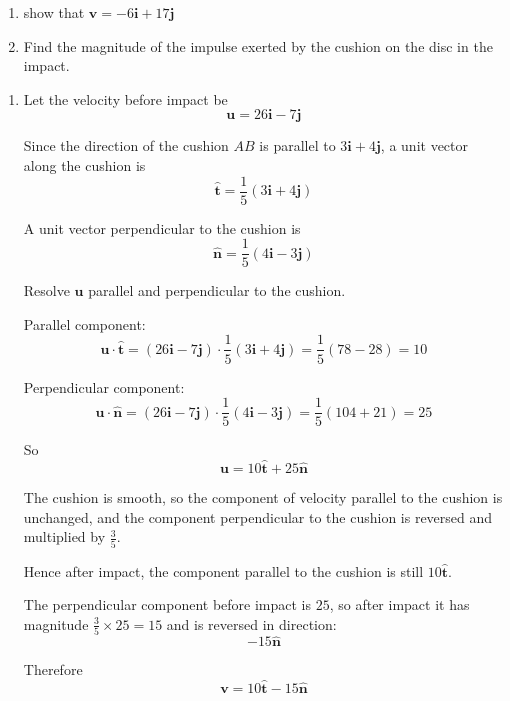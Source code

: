 \documentclass[leqno]{article}
\begin{document}
\begin{enumerate}[
  label=\textbf{\arabic*.},
  leftmargin=*,
  topsep=0pt,
  partopsep=0pt,
  parsep=0pt
]
\begin{enumerate}[label=\textbf{(\alph*)}]
  \item show that $\mathbf{v}=-6\mathbf{i}+17\mathbf{j}$  \\
  \item Find the magnitude of the impulse exerted by the cushion on the disc in the impact.  \\
\end{enumerate}

\vspace*{10pt}

\begin{djsSolution}
\begin{enumerate}[label=\textbf{(\alph*)}]
  \item Let the velocity before impact be
  \[
  \mathbf{u}=26\mathbf{i}-7\mathbf{j}
  \]

  Since the direction of the cushion $AB$ is parallel to $3\mathbf{i}+4\mathbf{j}$, a unit vector along the cushion is
  \[
  \hat{\mathbf{t}}=\frac{1}{5}(3\mathbf{i}+4\mathbf{j})
  \]

  A unit vector perpendicular to the cushion is
  \[
  \hat{\mathbf{n}}=\frac{1}{5}(4\mathbf{i}-3\mathbf{j})
  \]

  Resolve $\mathbf{u}$ parallel and perpendicular to the cushion.

  Parallel component:
  \[
  \mathbf{u}\cdot\hat{\mathbf{t}}
  =(26\mathbf{i}-7\mathbf{j})\cdot \frac{1}{5}(3\mathbf{i}+4\mathbf{j})
  =\frac{1}{5}(78-28)=10
  \]

  Perpendicular component:
  \[
  \mathbf{u}\cdot\hat{\mathbf{n}}
  =(26\mathbf{i}-7\mathbf{j})\cdot \frac{1}{5}(4\mathbf{i}-3\mathbf{j})
  =\frac{1}{5}(104+21)=25
  \]

  So
  \[
  \mathbf{u}=10\hat{\mathbf{t}}+25\hat{\mathbf{n}}
  \]

  The cushion is smooth, so the component of velocity parallel to the cushion is unchanged, and the component perpendicular to the cushion is reversed and multiplied by $\frac35$.

  Hence after impact, the component parallel to the cushion is still $10\hat{\mathbf{t}}$.

  The perpendicular component before impact is $25$, so after impact it has magnitude $\frac35\times 25=15$ and is reversed in direction:
  \[
  -15\hat{\mathbf{n}}
  \]

  Therefore
  \[
  \mathbf{v}=10\hat{\mathbf{t}}-15\hat{\mathbf{n}}
  \]


\end{enumerate}
\end{djsSolution}
\end{enumerate}
\end{document}

